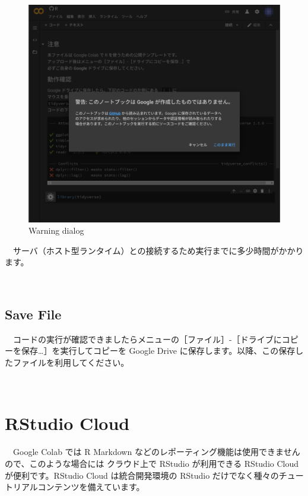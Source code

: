 \documentclass[
  12pt,
]{book}
\begin{document}
\begin{figure}[H]

{\centering \includegraphics[width=0.8\linewidth,]{fig/Colab/run_dialog} 

}

\caption{Warning dialog}\label{fig:unnamed-chunk-127}
\end{figure}

　サーバ（ホスト型ランタイム）との接続するため実行までに多少時間がかかります。

　

\hypertarget{save-file}{%
\subsection{Save File}\label{save-file}}

　コードの実行が確認できましたらメニューの［ファイル］-［ドライブにコピーを保存\ldots］を実行してコピーを Google Drive に保存します。以降、この保存したファイルを利用してください。

　

\hypertarget{rstudio-cloud-1}{%
\section{RStudio Cloud}\label{rstudio-cloud-1}}

　Google Colab では R Markdown などのレポーティング機能は使用できませんので、このような場合には クラウド上で RStudio が利用できる RStudio Cloud が便利です。RStudio Cloud は統合開発環境の RStudio だけでなく種々のチュートリアルコンテンツを備えています。\\
　\\
\end{document}
